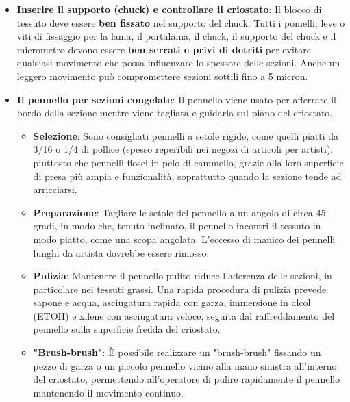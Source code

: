 \begin{itemize}
\item \textbf{Inserire il supporto (chuck) e controllare il criostato}: Il blocco di tessuto deve essere \textbf{ben fissato} nel supporto del chuck. Tutti i pomelli, leve o viti di fissaggio per la lama, il portalama, il chuck, il supporto del chuck e il micrometro devono essere \textbf{ben serrati e privi di detriti} per evitare qualsiasi movimento che possa influenzare lo spessore delle sezioni. Anche un leggero movimento può compromettere sezioni sottili fino a 5 micron.

\item \textbf{Il pennello per sezioni congelate}: Il pennello viene usato per afferrare il bordo della sezione mentre viene tagliata e guidarla sul piano del criostato.
\begin{itemize}
    \item \textbf{Selezione}: Sono consigliati pennelli a setole rigide, come quelli piatti da 3/16 o 1/4 di pollice (spesso reperibili nei negozi di articoli per artisti), piuttosto che pennelli flosci in pelo di cammello, grazie alla loro superficie di presa più ampia e funzionalità, soprattutto quando la sezione tende ad arricciarsi.
    \item \textbf{Preparazione}: Tagliare le setole del pennello a un angolo di circa 45 gradi, in modo che, tenuto inclinato, il pennello incontri il tessuto in modo piatto, come una scopa angolata. L'eccesso di manico dei pennelli lunghi da artista dovrebbe essere rimosso.
    \item \textbf{Pulizia}: Mantenere il pennello pulito riduce l'aderenza delle sezioni, in particolare nei tessuti grassi. Una rapida procedura di pulizia prevede sapone e acqua, asciugatura rapida con garza, immersione in alcol (ETOH) e xilene con asciugatura veloce, seguita dal raffreddamento del pennello sulla superficie fredda del criostato.
    \item \textbf{"Brush-brush"}: È possibile realizzare un "brush-brush" fissando un pezzo di garza o un piccolo pennello vicino alla mano sinistra all'interno del criostato, permettendo all'operatore di pulire rapidamente il pennello mantenendo il movimento continuo.
\end{itemize}


\end{itemize}
